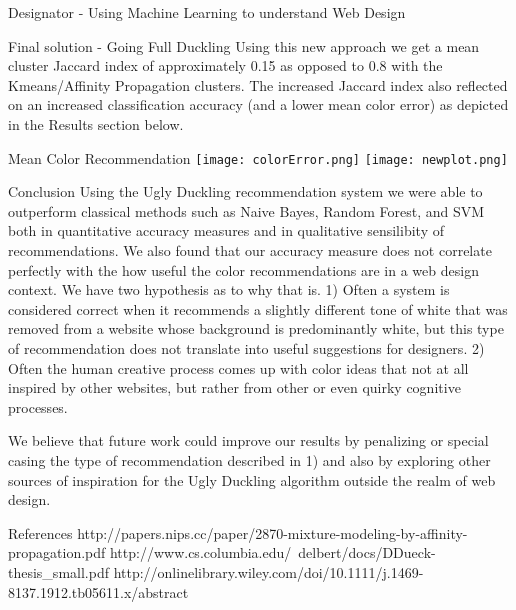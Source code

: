 \documentclass{beamer}
\begin{document}
\begin{frame}{\centerline{\Huge Designator - Using Machine Learning to understand Web Design}}
\begin{textblock}{5}
\begin{block}{Final solution - Going Full Duckling}
Using this new approach we get a mean cluster Jaccard index of approximately 0.15 as opposed to 0.8 with the
Kmeans/Affinity Propagation clusters. The increased Jaccard index also reflected on an increased classification accuracy
(and a lower mean color error) as depicted in the Results section below.

\end{block}
\begin{block}{Mean Color Recommendation}
\texttt{[image: colorError.png]}
\texttt{[image: newplot.png]}
\end{block}

\begin{block}{Conclusion}
Using the Ugly Duckling recommendation system we were able to outperform classical methods such as Naive Bayes, Random
Forest, and SVM both in quantitative accuracy measures and in qualitative sensilibity of recommendations. We also found
that our accuracy measure does not correlate perfectly with the how useful the color recommendations are in a web design
context. We have two hypothesis as to why that is. 1) Often a system is considered correct when it recommends a slightly
different tone of white that was removed from a website whose background is predominantly white, but this type of
recommendation does not translate into useful suggestions for designers. 2) Often the human creative process comes up
with
color ideas that not at all inspired by other websites, but rather from other or even quirky cognitive processes.

We believe that future work could improve our results by penalizing or special casing the type of recommendation
described in 1) and also by exploring other sources of inspiration for the Ugly Duckling algorithm outside the realm of
web design.
\end{block}

\begin{block}{References}
http://papers.nips.cc/paper/2870-mixture-modeling-by-affinity-propagation.pdf
http://www.cs.columbia.edu/~delbert/docs/DDueck-thesis\_small.pdf
http://onlinelibrary.wiley.com/doi/10.1111/j.1469-8137.1912.tb05611.x/abstract
\end{block}

\end{textblock}


\end{frame}
\end{document}

